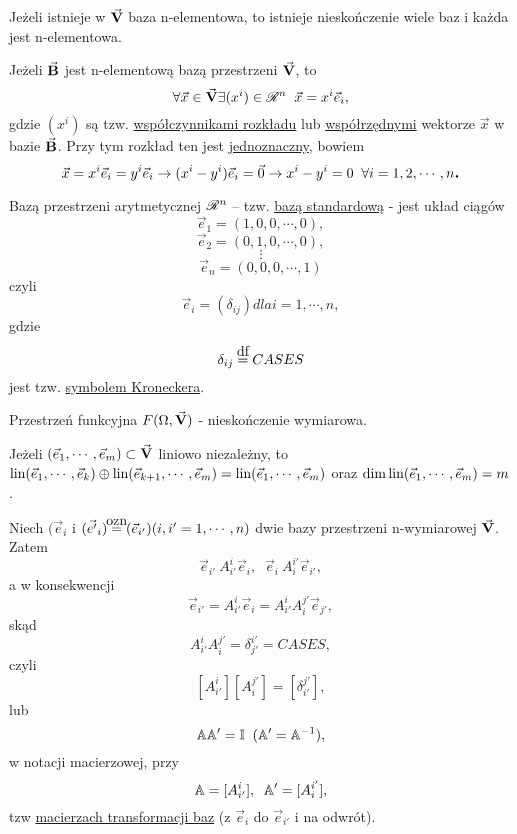 \begin{info}
   Jeżeli istnieje w $\vec{\mathbf{V}}$ baza n-elementowa, to istnieje nieskończenie wiele baz i każda jest n-elementowa.
\end{info}

\begin{info}
   Jeżeli $\vec{\mathbf{B}}$ jest n-elementową bazą przestrzeni $\vec{\mathbf{V}}$, to
   \[\forall \vec{x} \in \vec{\mathbf{V}} \exists (x^i) \in \mathscr{R}^n \;\; \vec{x} = x^i \vec{e}_i,\]
   gdzie $(x^i)$ są tzw. \underline{współczynnikami rozkładu} lub \underline{współrzędnymi} wektorze $\vec{x}$ w bazie $\vec{\mathbf{B}}$. Przy tym rozkład ten jest \underline{jednoznaczny}, bowiem
   \[\vec{x} = x^i \vec{e}_i = y^i \vec{e}_i \to (x^i - y^i) \vec{e}_i = \vec{0} \to x^i - y^i = 0 \;\; \forall i = 1,2,\cdots, n \mbox{\large\bfseries .}\]
\end{info}

\begin{example}
    Bazą przestrzeni arytmetycznej $\mathscr{R}^n$ -- tzw. \underline{bazą standardową} - jest układ ciągów
    \[\vec{e}_1 = (1, 0, 0, \cdots, 0),\]
    \[\vec{e}_2 = (0, 1, 0, \cdots, 0),\]
    \[\vdots\]
    \[\vec{e}_n = (0, 0, 0, \cdots, 1)\]
    czyli
    \[\vec{e}_i = (\delta_{ij}) dla i=1,\cdots, n,\]
    gdzie
    \[\delta_{ij} \df CASES\]
    jest tzw. \underline{symbolem Kroneckera}.
\end{example}

\begin{info}
    Przestrzeń funkcyjna $F(\Omega, \vec{\mathbf{V}})$ - nieskończenie wymiarowa.
\end{info}

\begin{info}
    Jeżeli $(\vec{e}_1, \cdots, \vec{e}_m) \subset \vec{\mathbf{V}}$ liniowo niezależny, to $\normalfont\mbox{lin}(\vec{e}_1, \cdots, \vec{e}_k) \oplus \normalfont\mbox{lin}(\vec{e}_{k+1}, \cdots, \vec{e}_m) = \normalfont\mbox{lin}(\vec{e}_1, \cdots, \vec{e}_m)$ oraz $\dim \normalfont\mbox{lin} (\vec{e}_1, \cdots, \vec{e}_m) = m$.
\end{info}


\begin{info}
    Niech $(\vec{e}_i$ i $(\vec{e'}_{i}) \ozn (\vec{e}_{i'}) (i,i'=1,\cdots,n)$ dwie bazy przestrzeni n-wymiarowej $\vec{\mathbf{V}}$. Zatem
    \[\vec{e}_{i'} \ A_{i'}^i \vec{e}_i, \;\; \vec{e}_{i} \ A_{i}^{i'} \vec{e}_{i'},\]
    a w konsekwencji
    \[\vec{e}_{i'} = A_{i'}^i \vec{e}_i = A_{i'}^i A_{i}^{j'} \vec{e}_{j'},\]
    skąd
    \[A_{i'}^i A_{i}^{j'} = \delta^{i'}_{j'} = CASES,\]
    czyli
    \[[A^{i}_{i'}][A^{j'}_{i}]=[\delta_{i'}^{j'}],\]
    lub
    \[\mathbb{A}\mathbb{A}' = \mathbb{I}\;\; (\mathbb{A}' = \mathbb{A}^{-1}),\]
    w notacji macierzowej, przy
    \[\mathbb{A} = [A^i_{i'}], \;\;  \mathbb{A}' = [A^{i'}_{i}],\]
    tzw \underline{macierzach transformacji baz} (z $\vec{e}_i$ do $\vec{e}_{i'}$ i na odwrót).
\end{info}

